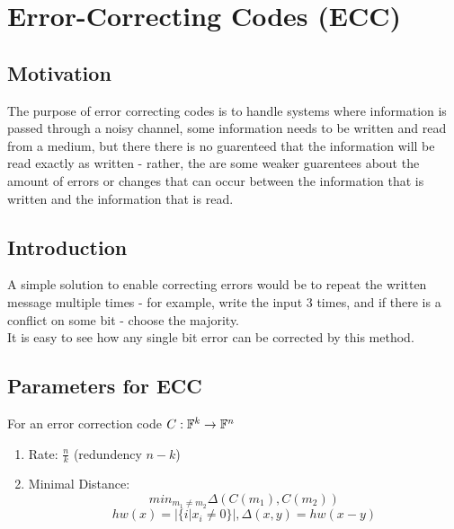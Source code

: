 \section*{Error-Correcting Codes (ECC)}
\subsection*{Motivation}
The purpose of error correcting codes is
to handle systems where information is passed through
a noisy channel, some information needs to be 
written and read from a medium, but there 
there is no guarenteed that the information
will be read exactly as written - rather, the
are some weaker guarentees about the amount of
errors or changes that can occur between the information
that is written and the information that is read.

\subsection*{Introduction}
A simple solution to enable correcting errors would
be to repeat the written message multiple times - for example,
write the input 3 times, and if there is a conflict on
some bit - choose the majority.\\
It is easy to see how any single bit error 
can be corrected by this method.\\

\subsection*{Parameters for ECC}
For an error correction code $C:\mathbb{F}^k\rightarrow\mathbb{F}^n$
\begin{enumerate}
	\item Rate: $\frac{n}{k}$ (redundency $n-k$)
	\item Minimal Distance:
	\[
		min_{m_1\neq m_2}\Delta\left(C(m_1),C(m_2)\right)
	\]\[
		hw(x)=|\{i|x_i\neq 0\}|, 
		\Delta(x,y) = hw(x-y)	
	\]
\end{enumerate}

